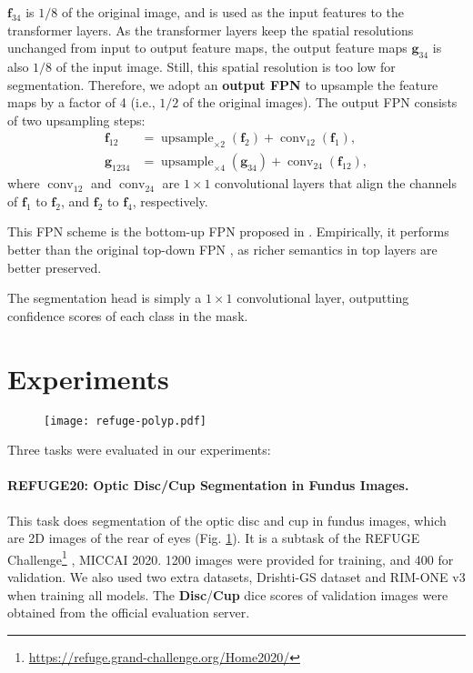 \documentclass{article}
\begin{document}
$\boldsymbol{f}_{34}$ is $1/8$ of the original image, and is used as the input features to the transformer layers. As the transformer layers keep the spatial resolutions unchanged from input to output feature maps, the output feature maps $\boldsymbol{g}_{34}$ is also $1/8$ of the input image. Still, this spatial resolution is too low for segmentation. Therefore, we adopt an \textbf{output FPN} to upsample the feature maps by a factor of 4 (i.e., $1/2$ of the original images). The output FPN consists of two upsampling steps:
\begin{align}
    \boldsymbol{f}_{12} &= \operatorname{upsample}_{\times 2}(\boldsymbol{f}_2) + \operatorname{conv}_{12}(\boldsymbol{f}_1), \nonumber \\
    \boldsymbol{g}_{1234} &= \operatorname{upsample}_{\times 4}(\boldsymbol{g}_{34}) + \operatorname{conv}_{24}(\boldsymbol{f}_{12}),
\end{align}
where $\operatorname{conv}_{12}$ and $\operatorname{conv}_{24}$ are $1\times 1$ convolutional layers that align the channels of $\boldsymbol{f}_1$ to $\boldsymbol{f}_2$, and $\boldsymbol{f}_2$ to $\boldsymbol{f}_4$, respectively.

This FPN scheme is the bottom-up FPN proposed in \cite{panet}. Empirically, it performs better than the original top-down FPN \cite{fpn}, as richer semantics in top layers are better preserved.

The segmentation head is simply a $1\times 1$ convolutional layer, outputting confidence scores of each class in the mask.

\section{Experiments}
\begin{figure}
\centering
  \texttt{[image: refuge-polyp.pdf]}
  \label{fig:refuge-polyp}
\end{figure}
Three tasks were evaluated in our experiments:

\paragraph{REFUGE20: Optic Disc/Cup Segmentation in Fundus Images.}
This task does segmentation of the optic disc and cup in fundus images, which are 2D images of the rear of eyes (Fig. \ref{fig:refuge-polyp}). It is a subtask of the REFUGE  Challenge\footnote{\url{https://refuge.grand-challenge.org/Home2020/}} \cite{refuge}, MICCAI 2020. 1200 images were provided for training, and 400 for validation. We also used two extra datasets, Drishti-GS dataset \cite{drishti} and RIM-ONE v3 \cite{rim-one} when training all models. The \textbf{Disc}/\textbf{Cup} dice scores of validation images were obtained from the official evaluation server.
\end{document}
